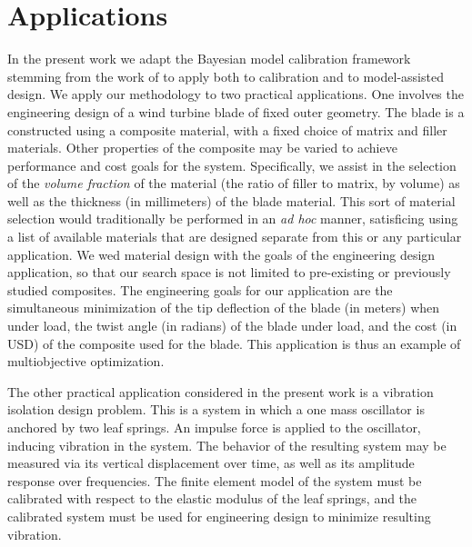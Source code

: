 \documentclass[12pt]{article}
\begin{document}
\section{Applications}

In the present work we adapt the Bayesian model calibration framework stemming from the work of \citet{Kennedy2001} to apply both to calibration and to model-assisted design. 
We apply our methodology to two practical applications.
One involves the engineering design of a wind turbine blade of fixed outer geometry.
The blade is a constructed using a composite material, with a fixed choice of matrix and filler materials.
Other properties of the composite may be varied to achieve performance and cost goals for the system.
Specifically, we assist in the selection of the \textit{volume fraction} of the material (the ratio of filler to matrix, by volume) as well as the thickness (in millimeters) of the blade material.
This sort of material selection would traditionally be performed in an \textit{ad hoc} manner, satisficing using a list of available materials that are designed separate from this or any particular application.
We wed material design with the goals of the engineering design application, so that our search space is not limited to pre-existing or previously studied composites.
The engineering goals for our application are the simultaneous minimization of the tip deflection of the blade (in meters) when under load, the twist angle (in radians) of the blade under load, and the cost (in USD) of the composite used for the blade.
This application is thus an example of multiobjective optimization. 

The other practical application considered in the present work is a vibration isolation design problem.
This is a system in which a one mass oscillator is anchored by two leaf springs.
An impulse force is applied to the oscillator, inducing vibration in the system.
The behavior of the resulting system may be measured via its vertical displacement over time, as well as its amplitude response over frequencies.
The finite element model of the system must be calibrated with respect to the elastic modulus of the leaf springs, and the calibrated system must be used for engineering design to minimize resulting vibration.
\end{document}
